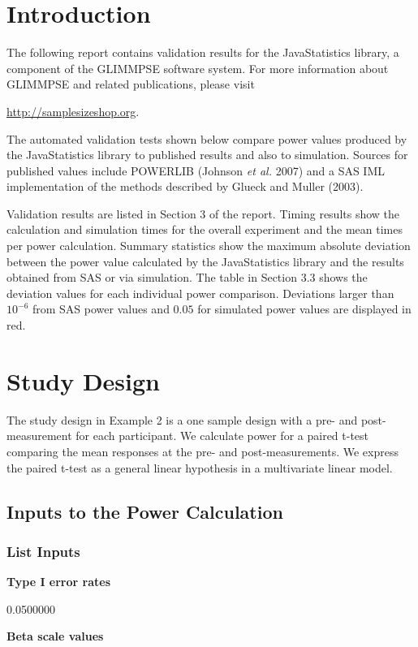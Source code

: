 \documentclass{glimmpse-report}
\begin{document}
\section{Introduction}
The following report contains validation results for the JavaStatistics library, a component of the GLIMMPSE software system.  For more information about GLIMMPSE and related publications, please visit

 

\href{http://samplesizeshop.org}{http://samplesizeshop.org}.

The automated validation tests shown below compare power values produced by the JavaStatistics library to published results and also to simulation.  Sources for published values include POWERLIB (Johnson \emph{et al.} 2007) and a SAS IML implementation of the methods described by Glueck and Muller (2003).

Validation results are listed in Section 3 of the report.  Timing results show the calculation and simulation times for the overall experiment and the mean times per power calculation.  Summary statistics show the maximum absolute deviation between the power value calculated by the JavaStatistics library and the results obtained from SAS or via simulation.  The table in Section 3.3 shows the deviation values for each individual power comparison.  Deviations larger than $10^{-6}$ from SAS power values and $0.05$ for simulated power values are displayed in red.

 \section{Study Design}
The study design in Example 2 is a one sample design with a pre- and post-measurement for each participant.  We calculate power for a paired t-test comparing the mean responses at the pre- and post-measurements.  We express the paired t-test as a general linear hypothesis in a multivariate linear model.
\subsection{Inputs to the Power Calculation}
\subsubsection{List Inputs}

{\bf Type I error rates}

0.0500000

{\bf Beta scale values}
\end{document}
